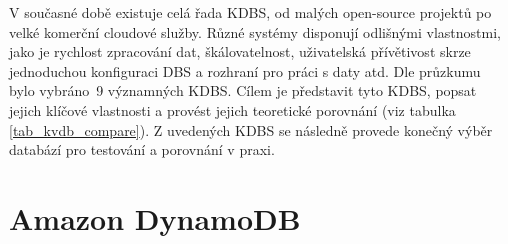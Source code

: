 \documentclass[czech,master,dept460,male,csharp,cpdeclaration]{diploma}
\begin{document}
	V současné době existuje celá řada KDBS, od malých open-source projektů po velké komerční cloudové služby. Různé systémy disponují odlišnými vlastnostmi, jako je rychlost zpracování dat, škálovatelnost, uživatelská přívětivost skrze jednoduchou konfiguraci DBS a rozhraní pro práci s daty atd. Dle průzkumu~\cite{predictiveanalyticstoday,g2,db-engineers-ranking} bylo vybráno~9 významných KDBS. Cílem je představit tyto KDBS, popsat jejich klíčové vlastnosti a provést jejich teoretické porovnání (viz tabulka \ref{tab_kvdb_compare}). Z uvedených KDBS se následně provede konečný výběr databází pro testování a porovnání v praxi.
	
	\section{Amazon DynamoDB}
	
\end{document}
